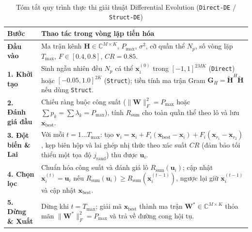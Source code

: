 \documentclass[12pt, a4paper]{article}
\begin{document}
\begin{table}[H]
    \centering
    \caption{Tóm tắt quy trình thực thi giải thuật Differential Evolution (\texttt{Direct-DE} / \texttt{Struct-DE})}
    \label{tab:algo_de}
    \renewcommand{\arraystretch}{1.18}
    \begin{tabularx}{\textwidth}{l X}
        \toprule
        \textbf{Bước} & \textbf{Thao tác trong vòng lặp tiến hóa} \\
        \midrule
        \textbf{Đầu vào} & Ma trận kênh $\mathbf{H} \in \mathbb{C}^{M\times K}$, $P_{\max}$, $\sigma^2$, cỡ quần thể $N_p$, số vòng lặp $T_{\max}$, $F \in [0.4, 0.8]$, $CR = 0.85$. \\
        \textbf{1. Khởi tạo} & Sinh ngẫu nhiên đều $N_p$ cá thể $\mathbf{x}_i^{(0)}$ trong $[-1,1]^{2MK}$ (\texttt{Direct}) hoặc $[-0.05, 1.0]^{2K}$ (\texttt{Struct}); tiền tính ma trận Gram $\mathbf{G}_H = \tilde{\mathbf{H}}^H\tilde{\mathbf{H}}$ nếu dùng \texttt{Struct}. \\
        \textbf{2. Đánh giá đầu} & Chiếu ràng buộc công suất ($\|\mathbf{W}\|_F^2 = P_{\max}$ hoặc $\sum p_k = \sum \lambda_k = P_{\max}$), tính $R_{\text{sum}}$ cho toàn quần thể theo lô và lưu $\mathbf{x}_{\text{best}}$. \\
        \textbf{3. Đột biến \& Lai} & Với mỗi $t = 1 \dots T_{\max}$: tạo $\mathbf{v}_i = \mathbf{x}_i + F_i(\mathbf{x}_{\text{best}} - \mathbf{x}_i) + F_i(\mathbf{x}_{r_1} - \mathbf{x}_{r_2})$, kẹp biên hộp và lai ghép nhị thức theo xác suất $CR$ (đảm bảo tối thiểu một tọa độ $j_{\text{rand}}$) thu được $\mathbf{u}_i$. \\
        \textbf{4. Chọn lọc} & Chuẩn hóa công suất và đánh giá lô $R_{\text{sum}}(\mathbf{u}_i)$; cập nhật $\mathbf{x}_i^{(t)} = \mathbf{u}_i$ nếu $R_{\text{sum}}(\mathbf{u}_i) \ge R_{\text{sum}}(\mathbf{x}_i^{(t-1)})$, ngược lại giữ $\mathbf{x}_i^{(t-1)}$ và cập nhật $\mathbf{x}_{\text{best}}$. \\
        \textbf{5. Dừng \& Xuất} & Dừng khi $t = T_{\max}$; giải mã $\mathbf{x}_{\text{best}}$ thành ma trận $\mathbf{W}^* \in \mathbb{C}^{M \times K}$ thỏa mãn $\|\mathbf{W}^*\|_F^2 = P_{\max}$ và trả về đường cong hội tụ. \\
        \bottomrule
    \end{tabularx}
\end{table}
\end{document}
